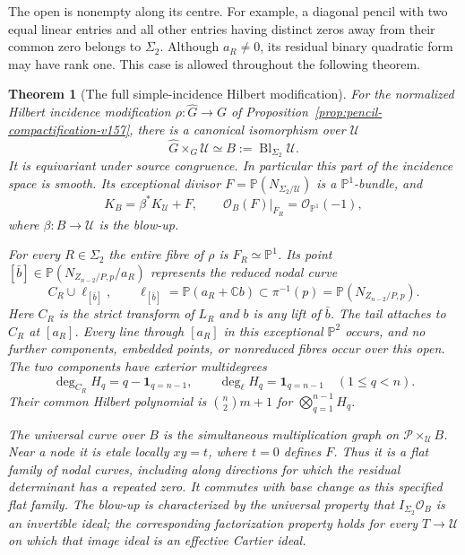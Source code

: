 \documentclass[11pt,reqno]{amsart}
\numberwithin{equation}{section}
\newtheorem{theorem}{Theorem}[section]
\theoremstyle{definition}\newtheorem{definition}[theorem]{Definition}
\theoremstyle{remark}\newtheorem{remark}[theorem]{Remark}
\newcommand{\C}{\mathbb C}\newcommand{\Q}{\mathbb Q}
\newcommand{\Pj}{\mathbb P}\newcommand{\A}{\mathbb A}
\newcommand{\OO}{\mathcal O}\newcommand{\II}{\mathcal I}
\begin{document}
The open is nonempty along its centre. For example, a diagonal pencil
with two equal linear entries and all other entries having distinct
zeros away from their common zero belongs to $\Sigma_2$.
Although $a_R\ne0$, its residual binary quadratic form may have rank
one. This case is allowed throughout the following theorem.

\begin{theorem}[The full simple-incidence Hilbert modification]
\label{thm:incidence-blowup-v160}
For the normalized Hilbert incidence modification
$\rho:\widehat G\to G$ of
Proposition~\ref{prop:pencil-compactification-v157}, there is a
canonical isomorphism over $\mathcal U$
\begin{equation}\label{eq:incidence-blowup-v160}
 \widehat G\times_G\mathcal U
       \simeq B:=\operatorname{Bl}_{\Sigma_2}\mathcal U.
\end{equation}
It is equivariant under source congruence. In particular this part
of the incidence space is smooth. Its exceptional divisor
$F=\Pj(N_{\Sigma_2/\mathcal U})$ is a $\Pj^1$-bundle, and
\begin{equation}\label{eq:incidence-canonical-v160}
 K_B=\beta^*K_{\mathcal U}+F,
 \qquad \OO_B(F)|_{F_R}=\OO_{\Pj^1}(-1),
\end{equation}
where $\beta:B\to\mathcal U$ is the blow-up.

For every $R\in\Sigma_2$ the entire fibre of $\rho$ is $F_R\simeq
\Pj^1$. Its point $[\bar b]\in\Pj(N_{Z_{n-2}/P,p}/a_R)$ represents
the reduced nodal curve
\begin{equation}\label{eq:incidence-fibre-v160}
 C_R\cup\ell_{[\bar b]},\qquad
 \ell_{[\bar b]}=\Pj(a_R+\C b)
                  \subset\pi^{-1}(p)=\Pj(N_{Z_{n-2}/P,p}).
\end{equation}
Here $C_R$ is the strict transform of $L_R$ and $b$ is any lift of
$\bar b$. The tail attaches to $C_R$ at $[a_R]$. Every line through
$[a_R]$ in this exceptional $\Pj^2$ occurs, and no further components,
embedded points, or nonreduced fibres occur over this open. The two
components have exterior multidegrees
\begin{equation}\label{eq:incidence-multidegrees-v160}
 \deg_{C_R}H_q=q-\mathbf1_{q=n-1},\qquad
 \deg_{\ell}H_q=\mathbf1_{q=n-1}\quad(1\leq q<n).
\end{equation}
Their common Hilbert polynomial is $\binom n2m+1$ for
$\bigotimes_{q=1}^{n-1}H_q$.

The universal curve over $B$ is the simultaneous multiplication graph
on $\mathcal P\times_{\mathcal U}B$. Near a node it is etale locally
$xy=t$, where $t=0$ defines $F$. Thus it is a flat family of nodal
curves, including along directions for which the residual determinant
has a repeated zero. It commutes with base change as this specified
flat family. The blow-up is characterized by the universal property
that $I_{\Sigma_2}\OO_B$ is an invertible ideal; the corresponding
factorization property holds for every $T\to\mathcal U$ on which
that image ideal is an effective Cartier ideal.
\end{theorem}
\end{document}
